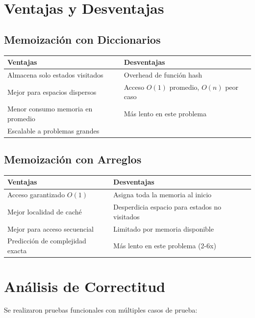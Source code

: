 \documentclass[12pt,letterpaper]{article}
\begin{document}
\section{Ventajas y Desventajas}

\subsection{Memoización con Diccionarios}

\begin{table}[H]
\centering
\begin{tabular}{|l|l|}
\hline
\textbf{Ventajas} & \textbf{Desventajas} \\
\hline
Almacena solo estados visitados & Overhead de función hash \\
Mejor para espacios dispersos & Acceso $O(1)$ promedio, $O(n)$ peor caso \\
Menor consumo memoria en promedio & Más lento en este problema \\
Escalable a problemas grandes & \phantom{x} \\
\hline
\end{tabular}
\end{table}

\subsection{Memoización con Arreglos}

\begin{table}[H]
\centering
\begin{tabular}{|l|l|}
\hline
\textbf{Ventajas} & \textbf{Desventajas} \\
\hline
Acceso garantizado $O(1)$ & Asigna toda la memoria al inicio \\
Mejor localidad de caché & Desperdicia espacio para estados no visitados \\
Mejor para acceso secuencial & Limitado por memoria disponible \\
Predicción de complejidad exacta & Más lento en este problema (2-6x) \\
\hline
\end{tabular}
\end{table}

\section{Análisis de Correctitud}

Se realizaron pruebas funcionales con múltiples casos de prueba:
\end{document}
